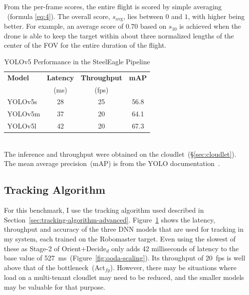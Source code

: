 From the per-frame scores, the entire flight is scored by simple
averaging ~(formula \ref{eq:4}). The overall score, $s_{\text{avg}}$,
lies between $0$ and $1$, with higher being better. For
example, an average score of $0.70$ based on $s_{10}$ is achieved when
the drone is able to keep the target within about three normalized
lengths of the center of the FOV for the entire duration of the
flight.

\begin{table}
\centering
\begin{tabular}{|l|c|c|c|}
\hline
\textbf{Model} & \textbf{Latency} & \textbf{Throughput} & \textbf{mAP} \\
 & (ms) & (fps) & \\
\hline
YOLOv5s  & 28 & 25 & 56.8\\
YOLOv5m  & 37 & 20 & 64.1\\
YOLOv5l  & 42 & 20 & 67.3\\
\hline
\end{tabular}
\begin{captext}
  \\[0.1cm] \small The inference and throughput were obtained on the
  cloudlet~(\S\ref{sec:cloudlet}).  The mean average precision~(mAP)
  is from the YOLO documentation~\cite{Yolo}.
\end{captext}
\caption{YOLOv5 Performance in the SteelEagle Pipeline}
\label{fig:yolo-model-stats}
\end{table}


\subsection{Tracking Algorithm}
\label{sec:tracking-algorithm}
For this benchmark, I use the tracking algorithm used described in Section~\ref{sec:tracking-algorithm-advanced}. Figure~\ref{fig:yolo-model-stats} shows the latency, throughput and
accuracy of the three DNN models that are used for tracking in my
system, each trained on the Robomaster target.  Even using the slowest of these as Stage-2 of
Orient+Decide$_d$ only adds 42 milliseconds of latency to the base
value of 527~ms~(Figure~\ref{fig:ooda-scaling}).  Its throughput of
20~fps is well above that of the bottleneck~(Act$_{fg}$).  However,
there may be situations where load on a multi-tenant cloudlet may need
to be reduced, and the smaller models may be valuable for that
purpose.

